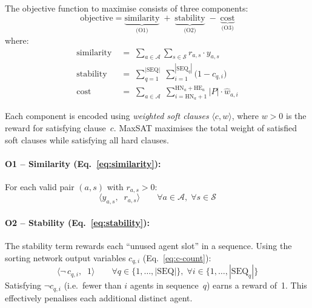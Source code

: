 \documentclass[11pt,a4paper]{article}
\newcommand{\setA}{\mathcal{A}}
\newcommand{\setS}{\mathcal{S}}
\newcommand{\SEQ}{\mathrm{SEQ}}
\newcommand{\HN}{\mathrm{HN}}
\newcommand{\HE}{\mathrm{HE}}
\begin{document}
The objective function to maximise consists of three components:
\begin{equation}\label{eq:sat-obj}
    \text{objective} = \underbrace{\text{similarity}}_{\text{(O1)}}
    \;+\; \underbrace{\text{stability}}_{\text{(O2)}}
    \;-\; \underbrace{\text{cost}}_{\text{(O3)}}
\end{equation}
where:
\begin{align}
    \text{similarity} \;&=\;
        \sum_{a \in \setA}\sum_{s \in \setS} r_{a,s} \cdot y_{a,s}
        \label{eq:similarity}\\
    \text{stability} \;&=\;
        \sum_{q=1}^{|\SEQ|} \;\sum_{i=1}^{|\SEQ_q|}
        \bigl(1 - c_{q,i}\bigr)
        \label{eq:stability}\\
    \text{cost} \;&=\;
        \sum_{a \in \setA}\;\sum_{i=\HN_a+1}^{\HN_a+\HE_a}
        |P| \cdot \hat{w}_{a,i}
        \label{eq:cost}
\end{align}

\noindent
Each component is encoded using \emph{weighted soft clauses}
$\langle c, w \rangle$, where $w > 0$ is the reward for satisfying clause~$c$.
MaxSAT maximises the total weight of satisfied soft clauses while satisfying
all hard clauses.

\paragraph{O1 -- Similarity (Eq.~\ref{eq:similarity}):}
For each valid pair $(a,s)$ with $r_{a,s} > 0$:
\begin{equation}\label{eq:soft-reward}
    \bigl\langle y_{a,s},\;\; r_{a,s}\bigr\rangle \qquad
    \forall a \in \setA,\; \forall s \in \setS
\end{equation}

\paragraph{O2 -- Stability (Eq.~\ref{eq:stability}):}
The stability term rewards each ``unused agent slot'' in a sequence.
Using the sorting network output variables $c_{q,i}$
(Eq.~\ref{eq:c-count}):
\begin{equation}\label{eq:soft-cont}
    \bigl\langle \neg\, c_{q,i},\;\; 1 \bigr\rangle \qquad
    \forall q \in \{1,\ldots,|\SEQ|\},\;
    \forall i \in \{1,\ldots,|\SEQ_q|\}
\end{equation}
Satisfying $\neg c_{q,i}$ (i.e.\ fewer than $i$ agents in sequence~$q$) earns
a reward of~1.  This effectively penalises each additional distinct agent.
\end{document}

